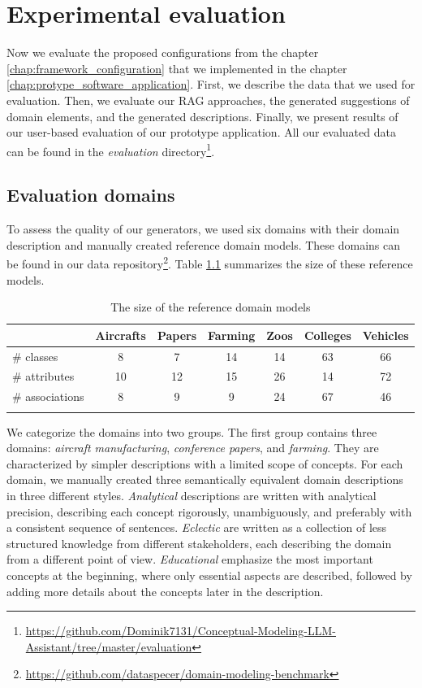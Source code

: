 \chapter{Experimental evaluation}
\label{chap:evaluation}

Now we evaluate the proposed configurations from the chapter \ref{chap:framework_configuration} that we implemented in the chapter \ref{chap:protype_software_application}. First, we describe the data that we used for evaluation. Then, we evaluate our RAG approaches, the generated suggestions of domain elements, and the generated descriptions. Finally, we present results of our user-based evaluation of our prototype application. All our evaluated data can be found in the \textit{evaluation} directory\footnote{\url{https://github.com/Dominik7131/Conceptual-Modeling-LLM-Assistant/tree/master/evaluation}}.


\section{Evaluation domains}

To assess the quality of our generators, we used six domains with their domain description and manually created reference domain models. These domains can be found in our data repository\footnote{\url{https://github.com/dataspecer/domain-modeling-benchmark}}. Table \ref{tab:reference-model-size} summarizes the size of these reference models.

\begin{table}[!h]
    \scriptsize
    \centering
    \setlength{\tabcolsep}{0.5em}
    \begin{tabular}{lcccccc}
         & Aircrafts & Papers & Farming & Zoos & Colleges & Vehicles \\
    \toprule
    \addlinespace
         \# classes      & 8  & 7  & 14 & 14 & 63 & 66 \\
         \# attributes   & 10 & 12 & 15 & 26 & 14 & 72 \\
         \# associations & 8  & 9  & 9  & 24 & 67 & 46 \\
    \addlinespace
    \bottomrule
    \addlinespace
    \end{tabular}
    \caption{The size of the reference domain models}
    \label{tab:reference-model-size}
\end{table}


We categorize the domains into two groups.
The first group contains three domains: \emph{aircraft manufacturing}, \emph{conference papers}, and \emph{farming}.
They are characterized by simpler descriptions with a limited scope of concepts.
For each domain, we manually created three semantically equivalent domain descriptions in three different styles.
\emph{Analytical} descriptions are written with analytical precision, describing each concept rigorously, unambiguously, and preferably with a consistent sequence of sentences.
\emph{Eclectic} are written as a collection of less structured knowledge from different stakeholders, each describing the domain from a different point of view.
\emph{Educational} emphasize the most important concepts at the beginning, where only essential aspects are described, followed by adding more details about the concepts later in the description.


